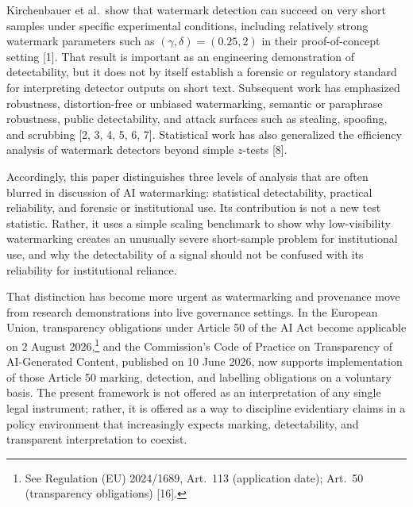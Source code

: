 \documentclass[11pt]{article}
\begin{document}
Kirchenbauer et al.\ show that watermark detection can succeed on very short
samples under specific experimental conditions, including relatively strong
watermark parameters such as $(\gamma, \delta) = (0.25, 2)$ in their
proof-of-concept setting [1]. That result is important as an engineering
demonstration of detectability, but it does not by itself establish a forensic or
regulatory standard for interpreting detector outputs on short text. Subsequent
work has emphasized robustness, distortion-free or unbiased watermarking, semantic
or paraphrase robustness, public detectability, and attack surfaces such as
stealing, spoofing, and scrubbing [2, 3, 4, 5, 6, 7]. Statistical work has also
generalized the efficiency analysis of watermark detectors beyond simple
$z$-tests [8].

Accordingly, this paper distinguishes three levels of analysis that are often
blurred in discussion of AI watermarking: statistical detectability, practical
reliability, and forensic or institutional use. Its contribution is not a new test
statistic. Rather, it uses a simple scaling benchmark to show why low-visibility
watermarking creates an unusually severe short-sample problem for institutional
use, and why the detectability of a signal should not be confused with its
reliability for institutional reliance.

That distinction has become more urgent as watermarking and provenance move from
research demonstrations into live governance settings. In the European Union,
transparency obligations under Article 50 of the AI Act become applicable on 2
August 2026,\footnote{See Regulation (EU) 2024/1689, Art.\ 113 (application date);
Art.\ 50 (transparency obligations) [16].} and the Commission's Code of Practice
on Transparency of AI-Generated Content, published on 10 June 2026, now supports
implementation of those Article 50 marking, detection, and labelling obligations
on a voluntary basis. The present framework is not offered as an interpretation of
any single legal instrument; rather, it is offered as a way to discipline
evidentiary claims in a policy environment that increasingly expects marking,
detectability, and transparent interpretation to coexist.
\end{document}
